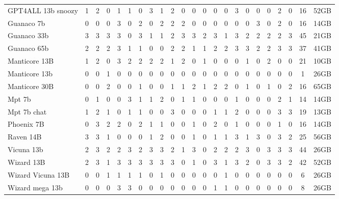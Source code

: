 \begin{table}[!htbp]
\begin{tabular}{l|cccccccccccccccccccc|c|r}
            GPT4ALL 13b snoozy & 1 & 2 & 0 & 1 & 1 & 0 & 3 & 1 & 2 & 0 & 0 & 0 & 0 & 0 & 3 & 0 & 0 & 0 & 2 & 0 & 16 & 52GB \\
            Guanaco 7b & 0 & 0 & 0 & 3 & 0 & 2 & 0 & 2 & 2 & 2 & 0 & 0 & 0 & 0 & 0 & 0 & 3 & 0 & 2 & 0 & 16 & 14GB \\
            Guanaco 33b & 3 & 3 & 3 & 3 & 0 & 3 & 1 & 1 & 2 & 3 & 3 & 2 & 3 & 1 & 3 & 2 & 2 & 2 & 2 & 3 & 45 & 21GB \\
            Guanaco 65b & 2 & 2 & 2 & 3 & 1 & 1 & 0 & 0 & 2 & 2 & 1 & 1 & 2 & 2 & 3 & 3 & 2 & 2 & 3 & 3 & 37 & 41GB \\
            Manticore 13B & 1 & 2 & 0 & 3 & 2 & 2 & 2 & 2 & 1 & 2 & 0 & 1 & 0 & 0 & 0 & 1 & 0 & 2 & 0 & 0 & 21 & 10GB \\
            Manticore 13b & 0 & 0 & 1 & 0 & 0 & 0 & 0 & 0 & 0 & 0 & 0 & 0 & 0 & 0 & 0 & 0 & 0 & 0 & 0 & 0 & 1 & 26GB \\
            Manticore 30B & 0 & 0 & 2 & 0 & 0 & 1 & 0 & 0 & 1 & 1 & 2 & 1 & 2 & 2 & 0 & 1 & 0 & 1 & 0 & 2 & 16 & 65GB \\
            Mpt 7b & 0 & 1 & 0 & 0 & 3 & 1 & 1 & 2 & 0 & 1 & 1 & 0 & 0 & 0 & 1 & 0 & 0 & 0 & 2 & 1 & 14 & 14GB \\
            Mpt 7b chat & 1 & 2 & 1 & 0 & 1 & 1 & 0 & 0 & 3 & 0 & 0 & 0 & 1 & 1 & 2 & 0 & 0 & 0 & 3 & 3 & 19 & 13GB \\
            Phoenix 7B & 0 & 3 & 2 & 2 & 0 & 2 & 1 & 1 & 0 & 0 & 1 & 0 & 2 & 0 & 1 & 0 & 0 & 0 & 1 & 0 & 16 & 14GB \\
            Raven 14B & 3 & 3 & 1 & 0 & 0 & 0 & 1 & 2 & 0 & 0 & 1 & 0 & 1 & 1 & 3 & 1 & 3 & 0 & 3 & 2 & 25 & 56GB \\
            Vicuna 13b & 2 & 3 & 2 & 2 & 3 & 2 & 3 & 3 & 2 & 1 & 3 & 0 & 2 & 2 & 2 & 3 & 0 & 3 & 3 & 3 & 44 & 26GB \\
            Wizard 13B & 2 & 3 & 1 & 3 & 3 & 3 & 3 & 3 & 3 & 0 & 1 & 0 & 3 & 1 & 3 & 2 & 0 & 3 & 3 & 2 & 42 & 52GB \\
            Wizard Vicuna 13B & 0 & 0 & 1 & 1 & 1 & 1 & 0 & 1 & 0 & 0 & 0 & 0 & 0 & 1 & 0 & 0 & 0 & 0 & 0 & 0 & 6 & 26GB \\
            Wizard mega 13b & 0 & 0 & 0 & 3 & 3 & 0 & 0 & 0 & 0 & 0 & 0 & 0 & 1 & 1 & 0 & 0 & 0 & 0 & 0 & 0 & 8 & 26GB \\
            \bottomrule
        \end{tabular}
        \setlength{\tabcolsep}{6pt}
\end{table}
